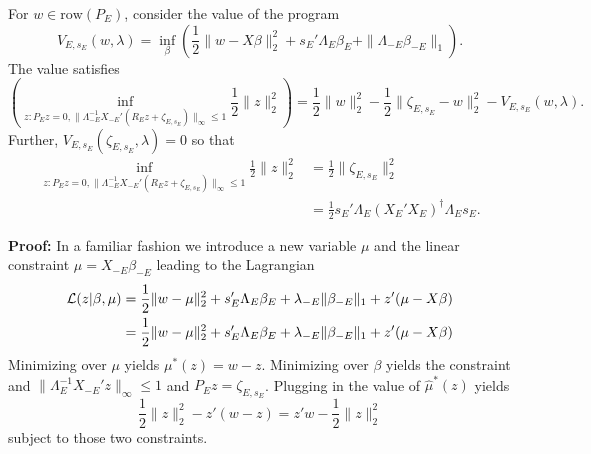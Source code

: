 \documentclass{article}
\begin{document}
          
        \begin{lemma}
          For $w \in \text{row}(P_E)$, consider the value of the
          program
          \begin{equation}
            \label{eq:dual:value}
            V_{E,s_E}(w,\lambda) = \inf_{\beta} \left(\frac{1}{2}
            \|w-X\beta\|^2_2 + s_E'\Lambda_E\beta_E +
            \|\Lambda_{-E}\beta_{-E}\|_1 \right).
          \end{equation}
The value satisfies
          \begin{equation}
            \label{eq:value:map}
\left( \inf_{z:P_Ez=0,
  \|\Lambda_{-E}^{-1}X_{-E}'(R_Ez+\zeta_{E,s_E})\|_{\infty} \leq 1}
\frac{1}{2} \|z\|^2_2 \right) = \frac{1}{2} \|w\|^2_2 -
\frac{1}{2}\|\zeta_{E,s_E}-w\|^2_2 - V_{E,s_E}(w,\lambda).
          \end{equation}
          Further, $V_{E,s_E}(\zeta_{E,s_E}, \lambda) = 0$ so that
          \begin{equation}
            \label{eq:LD:lasso}
            \begin{aligned}
            \inf_{z:P_Ez=0,
              \|\Lambda_{-E}^{-1}X_{-E}'(R_Ez+\zeta_{E,s_E})\|_{\infty}
              \leq 1}\frac{1}{2} \|z\|^2_2  &= \frac{1}{2}
            \|\zeta_{E,s_E}\|^2_2 \\ &=
            \frac{1}{2}s_E'\Lambda_E(X_E'X_E)^{\dagger}\Lambda_Es_E.
          \end{aligned}
            \end{equation}
          \end{lemma}

        {\bf Proof:} In a familiar fashion we introduce a new variable
        $\mu$ and the linear constraint $\mu=X_{-E}\beta_{-E}$ leading
        to the Lagrangian
        $$
        \begin{aligned}
        {\cal L}(z|\beta,\mu) &= \frac{1}{2} \|w-\mu\|^2_2 +
        s_E'\Lambda_E\beta_E + \lambda_{-E} \|\beta_{-E}\|_1 +
        z'(\mu-X\beta) \\ &= \frac{1}{2} \|w-\mu\|^2_2 +
        s_E'\Lambda_E\beta_E + \lambda_{-E} \|\beta_{-E}\|_1 +
        z'(\mu-X\beta) \\
        \end{aligned}
        $$ Minimizing over $\mu$ yields $\mu^*(z)=w-z$. Minimizing
        over $\beta$ yields the constraint and
        $\|\Lambda_E^{-1}X_{-E}'z\|_{\infty} \leq 1$ and
        $P_Ez=\zeta_{E,s_E}$.  Plugging in the value of
        $\hat{\mu}^*(z)$ yields
        $$ \frac{1}{2}\|z\|^2_2 - z'(w-z) = z'w - \frac{1}{2}\|z\|^2_2
        $$ subject to those two constraints.
\end{document}
